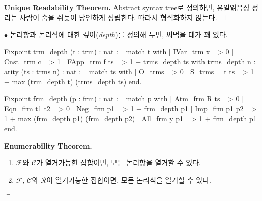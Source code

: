 \documentclass[12pt]{paper}
\newenvironment{context}[1][]
{ \noindent \textbf{{#1}.} }
{ \hfill $ \dashv $ }
\begin{document}
\begin{context}[Unique Readability Theorem]
Abstract syntax tree로 정의하면, 유일읽음성 정리는 사람이 숨을 쉬듯이 당연하게 성립한다.
따라서 형식화하지 않는다.
\end{context}
  
\newpage

\par \noindent $\bullet$
논리항과 논리식에 대한 \underline{깊이}(\textit{depth})를 정의해 두면, 써먹을 데가 꽤 있다.
\begin{coqcode}
Fixpoint trm_depth (t : trm) : nat :=
  match t with
  | IVar_trm x => 0
  | Cnst_trm c => 1
  | FApp_trm f ts => 1 + trms_depth ts
with trms_depth {n : arity} (ts : trms n) : nat :=
  match ts with
  | O_trms => 0
  | S_trms _ t ts => 1 + max (trm_depth t) (trms_depth ts)
  end.

Fixpoint frm_depth (p : frm) : nat :=
  match p with
  | Atm_frm R ts => 0
  | Eqn_frm t1 t2 => 0
  | Neg_frm p1 => 1 + frm_depth p1
  | Imp_frm p1 p2 => 1 + max (frm_depth p1) (frm_depth p2)
  | All_frm y p1 => 1 + frm_depth p1
  end.
\end{coqcode}

\begin{context}[Enumerability Theorem]
\begin{enumerate}
\item $\mathcal{F}$와 $\mathcal{C}$가 열거가능한 집합이면, 모든 논리항을 열거할 수 있다.
\item $\mathcal{F}$, $\mathcal{C}$와 $\mathcal{R}$이 열거가능한 집합이면, 모든 논리식을 열거할 수 있다.
\end{enumerate}
\end{context}
\end{document}
